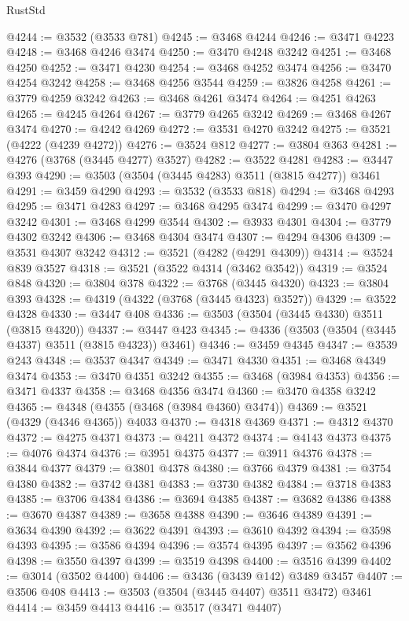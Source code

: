 \begin{lexlean}{RustStd}
\begin{coremodule}
@4244 := @3532 (@3533 @781)
@4245 := @3468 @4244
@4246 := @3471 @4223
@4248 := @3468 @4246 @3474
@4250 := @3470 @4248 @3242
@4251 := @3468 @4250
@4252 := @3471 @4230
@4254 := @3468 @4252 @3474
@4256 := @3470 @4254 @3242
@4258 := @3468 @4256 @3544
@4259 := @3826 @4258
@4261 := @3779 @4259 @3242
@4263 := @3468 @4261 @3474
@4264 := @4251 @4263
@4265 := @4245 @4264
@4267 := @3779 @4265 @3242
@4269 := @3468 @4267 @3474
@4270 := @4242 @4269
@4272 := @3531 @4270 @3242
@4275 := @3521 (@4222 (@4239 @4272))
@4276 := @3524 @812
@4277 := @3804 @363
@4281 := @4276 (@3768 (@3445 @4277) @3527)
@4282 := @3522 @4281
@4283 := @3447 @393
@4290 := @3503 (@3504 (@3445 @4283) @3511 (@3815 @4277)) @3461
@4291 := @3459 @4290
@4293 := @3532 (@3533 @818)
@4294 := @3468 @4293
@4295 := @3471 @4283
@4297 := @3468 @4295 @3474
@4299 := @3470 @4297 @3242
@4301 := @3468 @4299 @3544
@4302 := @3933 @4301
@4304 := @3779 @4302 @3242
@4306 := @3468 @4304 @3474
@4307 := @4294 @4306
@4309 := @3531 @4307 @3242
@4312 := @3521 (@4282 (@4291 @4309))
@4314 := @3524 @839 @3527
@4318 := @3521 (@3522 @4314 (@3462 @3542))
@4319 := @3524 @848
@4320 := @3804 @378
@4322 := @3768 (@3445 @4320)
@4323 := @3804 @393
@4328 := @4319 (@4322 (@3768 (@3445 @4323) @3527))
@4329 := @3522 @4328
@4330 := @3447 @408
@4336 := @3503 (@3504 (@3445 @4330) @3511 (@3815 @4320))
@4337 := @3447 @423
@4345 := @4336 (@3503 (@3504 (@3445 @4337) @3511 (@3815 @4323)) @3461)
@4346 := @3459 @4345
@4347 := @3539 @243
@4348 := @3537 @4347
@4349 := @3471 @4330
@4351 := @3468 @4349 @3474
@4353 := @3470 @4351 @3242
@4355 := @3468 (@3984 @4353)
@4356 := @3471 @4337
@4358 := @3468 @4356 @3474
@4360 := @3470 @4358 @3242
@4365 := @4348 (@4355 (@3468 (@3984 @4360) @3474))
@4369 := @3521 (@4329 (@4346 @4365)) @4033
@4370 := @4318 @4369
@4371 := @4312 @4370
@4372 := @4275 @4371
@4373 := @4211 @4372
@4374 := @4143 @4373
@4375 := @4076 @4374
@4376 := @3951 @4375
@4377 := @3911 @4376
@4378 := @3844 @4377
@4379 := @3801 @4378
@4380 := @3766 @4379
@4381 := @3754 @4380
@4382 := @3742 @4381
@4383 := @3730 @4382
@4384 := @3718 @4383
@4385 := @3706 @4384
@4386 := @3694 @4385
@4387 := @3682 @4386
@4388 := @3670 @4387
@4389 := @3658 @4388
@4390 := @3646 @4389
@4391 := @3634 @4390
@4392 := @3622 @4391
@4393 := @3610 @4392
@4394 := @3598 @4393
@4395 := @3586 @4394
@4396 := @3574 @4395
@4397 := @3562 @4396
@4398 := @3550 @4397
@4399 := @3519 @4398
@4400 := @3516 @4399
@4402 := @3014 (@3502 @4400)
@4406 := @3436 (@3439 @142) @3489 @3457
@4407 := @3506 @408
@4413 := @3503 (@3504 (@3445 @4407) @3511 @3472) @3461
@4414 := @3459 @4413
@4416 := @3517 (@3471 @4407)

\end{coremodule}
\end{lexlean}
